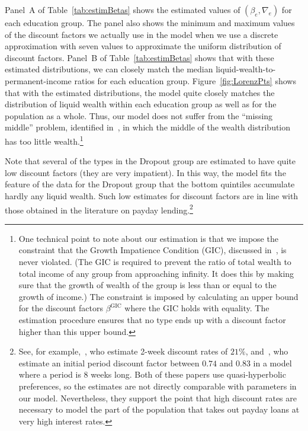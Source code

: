 \documentclass[\latexroot/\projectname]{subfiles}
\begin{document}
Panel~A of Table~\ref{tab:estimBetas} shows the estimated values of $(\beta_e, \nabla_e)$ for each education group.
The panel also shows the minimum and maximum values of the discount factors we actually use in the model when we use a discrete approximation with seven values to approximate the uniform distribution of discount factors.
Panel~B of Table~\ref{tab:estimBetas} shows that with these estimated distributions, we can closely match the median liquid-wealth-to-permanent-income ratios for each education group.
Figure~\ref{fig:LorenzPts} shows that with the estimated distributions, the model quite closely matches the distribution of liquid wealth within each education group as well as for the population as a whole.
Thus, our model does not suffer from the ``missing middle'' problem, identified in~\cite{kaplanMPC2022}, in which the middle of the wealth distribution has too little wealth.\footnote{One technical point to note about our estimation is that we impose the constraint that the Growth Impatience Condition (GIC), discussed in~\cite{carroll2022theoretical}, is never violated. (The GIC is required to prevent the ratio of total wealth to total income of any group from approaching infinity. It does this by making sure that the growth of wealth of the group is less than or equal to the growth of income.) The constraint is imposed by calculating an upper bound for the discount factors $\beta^{\text{GIC}}$ where the GIC holds with equality. The estimation procedure ensures that no type ends up with a discount factor higher than this upper bound.}



Note that several of the types in the Dropout group are estimated to have quite low discount factors (they are very impatient).
In this way, the model fits the feature of the data for the Dropout group that the bottom quintiles accumulate hardly any liquid wealth.
Such low estimates for discount factors are in line with those obtained in the literature on payday lending.\footnote{See, for example,~\cite{skiba2008payday}, who estimate 2-week discount rates of $21\%$, and~\cite{allcott2022high}, who estimate an initial period discount factor between $0.74$ and $0.83$ in a model where a period is 8 weeks long.
  Both of these papers use quasi-hyperbolic preferences, so the estimates are not directly comparable with parameters in our model.
  Nevertheless, they support the point that high discount rates are necessary to model the part of the population that takes out payday loans at very high interest rates.}
\end{document}
